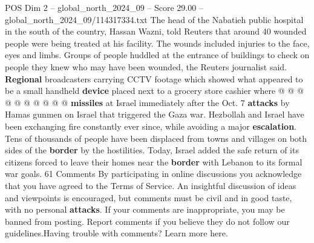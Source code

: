 \begin{textsample}{POS Dim 2 – global\_north\_2024\_09 – Score 29.00 – global\_north\_2024\_09/114317334.txt}
The head of the Nabatieh public hospital in the south of the country, Hassan Wazni, told Reuters that around 40 wounded people were being treated at his facility.
The wounds included injuries to the face, eyes and limbs.
Groups of people huddled at the entrance of buildings to check on people they knew who may have been wounded, the Reuters journalist said. \textbf{Regional} broadcasters carrying CCTV footage which showed what appeared to be a small handheld \textbf{device} placed next to a grocery store cashier where @ @ @ @ @ @ @ @ @ @ \textbf{missiles} at Israel immediately after the Oct. 7 \textbf{attacks} by Hamas gunmen on Israel that triggered the Gaza war.
Hezbollah and Israel have been exchanging fire constantly ever since, while avoiding a major \textbf{escalation}.
Tens of thousands of people have been displaced from towns and villages on both sides of the \textbf{border} by the hostilities.
Today, Israel added the safe return of its citizens forced to leave their homes near the \textbf{border} with Lebanon to its formal war goals. 61 Comments By participating in online discussions you acknowledge that you have agreed to the Terms of Service.
An insightful discussion of ideas and viewpoints is encouraged, but comments must be civil and in good taste, with no personal \textbf{attacks}.
If your comments are inappropriate, you may be banned from posting.
Report comments if you believe they do not follow our guidelines.Having trouble with comments?
Learn more here.

\end{textsample}
